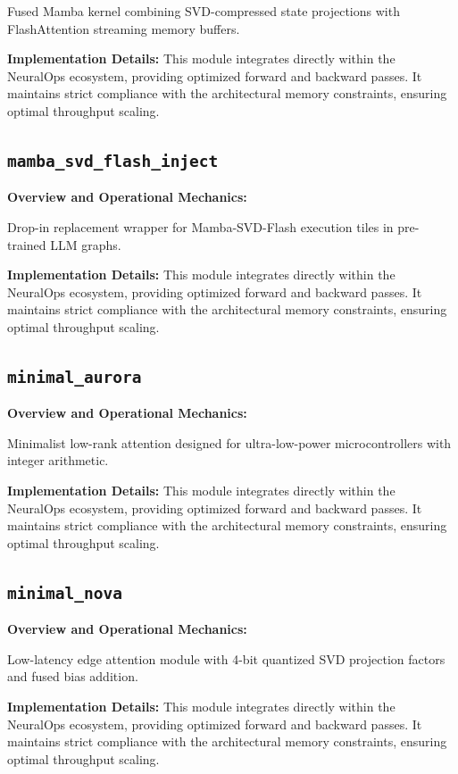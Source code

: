 \documentclass[10pt,twocolumn,letterpaper]{article}
\begin{document}
Fused Mamba kernel combining SVD-compressed state projections with FlashAttention streaming memory buffers.

\textbf{Implementation Details:}
This module integrates directly within the NeuralOps ecosystem, providing optimized forward and backward passes. It maintains strict compliance with the architectural memory constraints, ensuring optimal throughput scaling.

\subsection{\texttt{mamba\_svd\_flash\_inject}}
\textbf{Overview and Operational Mechanics:}

Drop-in replacement wrapper for Mamba-SVD-Flash execution tiles in pre-trained LLM graphs.

\textbf{Implementation Details:}
This module integrates directly within the NeuralOps ecosystem, providing optimized forward and backward passes. It maintains strict compliance with the architectural memory constraints, ensuring optimal throughput scaling.

\subsection{\texttt{minimal\_aurora}}
\textbf{Overview and Operational Mechanics:}

Minimalist low-rank attention designed for ultra-low-power microcontrollers with integer arithmetic.

\textbf{Implementation Details:}
This module integrates directly within the NeuralOps ecosystem, providing optimized forward and backward passes. It maintains strict compliance with the architectural memory constraints, ensuring optimal throughput scaling.

\subsection{\texttt{minimal\_nova}}
\textbf{Overview and Operational Mechanics:}

Low-latency edge attention module with 4-bit quantized SVD projection factors and fused bias addition.

\textbf{Implementation Details:}
This module integrates directly within the NeuralOps ecosystem, providing optimized forward and backward passes. It maintains strict compliance with the architectural memory constraints, ensuring optimal throughput scaling.
\end{document}
